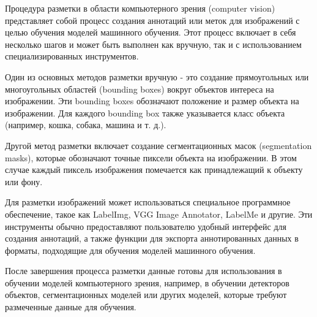 Процедура разметки в области компьютерного зрения (computer vision) представляет собой процесс создания аннотаций или меток для изображений с целью обучения моделей машинного обучения. Этот процесс включает в себя несколько шагов и может быть выполнен как вручную, так и с использованием специализированных инструментов.

Один из основных методов разметки вручную - это создание прямоугольных или многоугольных областей (bounding boxes) вокруг объектов интереса на изображении. Эти bounding boxes обозначают положение и размер объекта на изображении. Для каждого bounding box также указывается класс объекта (например, кошка, собака, машина и т. д.).

Другой метод разметки включает создание сегментационных масок (segmentation masks), которые обозначают точные пиксели объекта на изображении. В этом случае каждый пиксель изображения помечается как принадлежащий к объекту или фону.

Для разметки изображений может использоваться специальное программное обеспечение, такое как LabelImg, VGG Image Annotator, LabelMe и другие. Эти инструменты обычно предоставляют пользователю удобный интерфейс для создания аннотаций, а также функции для экспорта аннотированных данных в форматы, подходящие для обучения моделей машинного обучения.

После завершения процесса разметки данные готовы для использования в обучении моделей компьютерного зрения, например, в обучении детекторов объектов, сегментационных моделей или других моделей, которые требуют размеченные данные для обучения.
